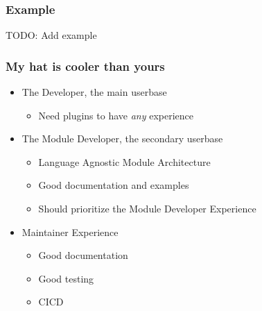 \begin{frame}
  \frametitle{Example}
  TODO: Add example
\end{frame}

\begin{frame}
  \frametitle{My hat is cooler than yours}
  \begin{itemize}
    \item The Developer, the main userbase
    \begin{itemize}
      \item Need plugins to have \textit{any} experience
    \end{itemize}
    \item The Module Developer, the secondary userbase
      \begin{itemize}
        \item Language Agnostic Module Architecture
        \item Good documentation and examples
        \item Should prioritize the Module Developer Experience
      \end{itemize}
    \item Maintainer Experience
      \begin{itemize}
        \item Good documentation
        \item Good testing
        \item CI\/CD
      \end{itemize}
  \end{itemize}
\end{frame}
